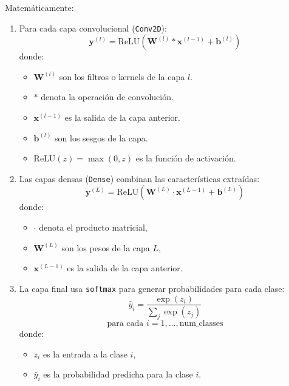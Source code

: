 \documentclass[../main.tex]{subfiles}
\begin{document}
\begin{itemize}
\begin{enumerate}
      Matemáticamente:

      \begin{enumerate}
          \item Para cada capa convolucional (\texttt{Conv2D}):
          \[
          \mathbf{y}^{(l)} = \text{ReLU}\left(\mathbf{W}^{(l)} * \mathbf{x}^{(l-1)} + \mathbf{b}^{(l)}\right)
          \]
          donde:
          \begin{itemize}
              \item \(\mathbf{W}^{(l)}\) son los filtros o kernels de la capa \(l\).
              \item \(*\) denota la operación de convolución.
              \item \(\mathbf{x}^{(l-1)}\) es la salida de la capa anterior.
              \item \(\mathbf{b}^{(l)}\) son los sesgos de la capa.
              \item \(\text{ReLU}(z) = \max(0, z)\) es la función de activación.
          \end{itemize}
          \item Las capas densas (\texttt{Dense}) combinan las características extraídas:
          \[
          \mathbf{y}^{(L)} = \text{ReLU}\left(\mathbf{W}^{(L)} \cdot \mathbf{x}^{(L-1)} + \mathbf{b}^{(L)}\right)
          \]
          donde:
          \begin{itemize}
              \item \(\cdot\) denota el producto matricial,
              \item \(\mathbf{W}^{(L)}\) son los pesos de la capa \(L\),
              \item \(\mathbf{x}^{(L-1)}\) es la salida de la capa anterior.
          \end{itemize}
          \item La capa final usa \texttt{softmax} para generar probabilidades para cada clase:
          \[
          \hat{y}_i = \frac{\exp(z_i)}{\sum_{j} \exp(z_j)}
          \]
          \[
          \text{para cada } i = 1, \dots, \text{num\_classes}
          \]
          donde:
          \begin{itemize}
              \item \(z_i\) es la entrada a la clase \(i\),
              \item \(\hat{y}_i\) es la probabilidad predicha para la clase \(i\).
          \end{itemize}
      \end{enumerate}


\end{enumerate}
\end{itemize}
\end{document}
